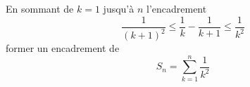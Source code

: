 En sommant de $k=1$ jusqu'\`a $n$ l'encadrement
\[\dfrac{1}{(k+1)^2}\leq \dfrac{1}{k}-\dfrac{1}{k+1}\leq \dfrac{1}{k^2}\]
former un encadrement de 
\[S_n=\sum _{k=1}^n \dfrac{1}{k^2}\]
\bigskip